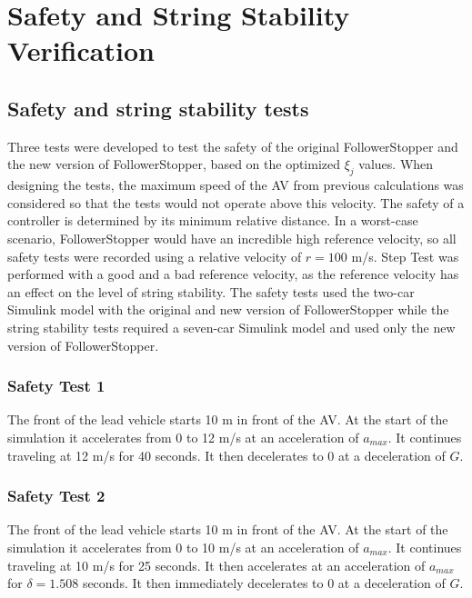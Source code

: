 \documentclass[conference]{IEEEtran}
\begin{document}



\section{Safety and String Stability Verification}

\subsection{Safety and string stability tests}
Three tests were developed to test the safety of the original FollowerStopper and the new version of FollowerStopper, based on the optimized $\xi_j$ values. When designing the tests, the maximum speed of the AV from previous calculations was considered so that the tests would not operate above this velocity. The safety of a controller is determined by its minimum relative distance. In a worst-case scenario, FollowerStopper would have an incredible high reference velocity, so all safety tests were recorded using a relative velocity of $r=100$ m/s. Step Test was performed with a good and a bad reference velocity, as the reference velocity has an effect on the level of string stability. The safety tests used the two-car Simulink model with the original and new version of FollowerStopper while the string stability tests required a seven-car Simulink model and used only the new version of FollowerStopper.
\subsubsection{Safety Test 1}
The front of the lead vehicle starts 10 m in front of the AV. At the start of the simulation it accelerates from 0 to 12 m/s at an acceleration of $a_{max}$. It continues traveling at 12 m/s for 40 seconds. It then decelerates to 0 at a deceleration of $G$.
\subsubsection{Safety Test 2}
The front of the lead vehicle starts 10 m in front of the AV. At the start of the simulation it accelerates from 0 to 10 m/s at an acceleration of $a_{max}$. It continues traveling at 10 m/s for 25 seconds. It then accelerates at an acceleration of $a_{max}$ for $\delta=1.508$ seconds. It then immediately decelerates to 0 at a deceleration of $G$.
\end{document}
